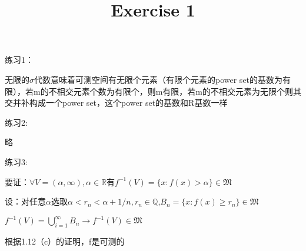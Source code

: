 \documentclass{article}
\title{Exercise 1}
\begin{document}
\maketitle
\begin{CJK}{UTF8}{gbsn}
练习1：

无限的$\sigma$代数意味着可测空间有无限个元素（有限个元素的power set的基数为有限），若m的不相交元素个数为有限个，则m有限，若m的不相交元素为无限个则其交并补构成一个power set，这个power set的基数和R基数一样

\vspace{0.2cm}

练习2:

略

\vspace{0.2cm}

练习3:

要证：$\forall V=(\alpha,\infty),\alpha\in \mathbb{R}$有$ f^{-1}(V)=\{x: f(x)>\alpha\}\in\mathfrak{M}$

设：对任意$\alpha$选取$\alpha<r_n<\alpha+1/n,r_n\in\mathbb{Q}$,$B_n=\{x:f(x)\ge r_n\}\in\mathfrak{M}$

$ f^{-1}(V)=\bigcup_{i=1}^{\infty}B_n\rightarrow f^{-1}(V)\in\mathfrak{M}$

根据1.12（c）的证明，f是可测的








\end{CJK}
\end{document}
